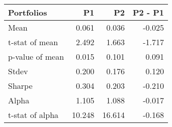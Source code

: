 \begin{tabular}{lrrr}
\toprule
Portfolios & P1 & P2 & P2 - P1 \\
\midrule
Mean & 0.061 & 0.036 & -0.025 \\
t-stat of mean & 2.492 & 1.663 & -1.717 \\
p-value of mean & 0.015 & 0.101 & 0.091 \\
Stdev & 0.200 & 0.176 & 0.120 \\
Sharpe & 0.304 & 0.203 & -0.210 \\
Alpha & 1.105 & 1.088 & -0.017 \\
t-stat of alpha & 10.248 & 16.614 & -0.168 \\
\bottomrule
\end{tabular}
